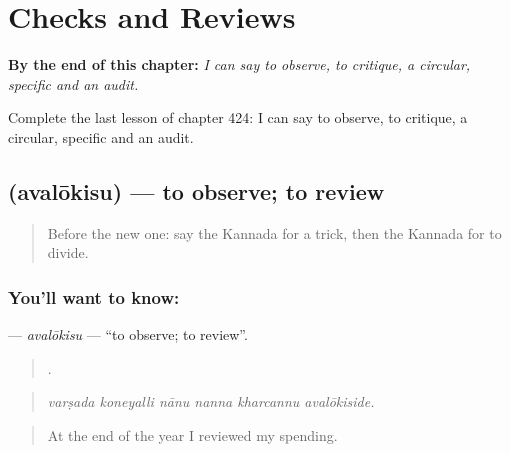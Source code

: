 
\chapter{Checks and Reviews}
\label{ch:ka-checks-and-reviews}

\begin{chapteropening}
\textbf{By the end of this chapter:} \emph{I can say to observe, to critique, a circular, specific and an audit.}

Complete the last lesson of chapter 424: I can say to observe, to critique, a circular, specific and an audit.
\end{chapteropening}

\section[\texorpdfstring{\kn{ಅವಲೋಕಿಸು} (avalōkisu)}{ಅವಲೋಕಿಸು (avalōkisu)}]{ (avalōkisu) — to observe; to review}

\label{lesson:KA-C424-avalokisu}



\begin{quote}
Before the new one: say the Kannada for a trick, then the Kannada for to divide.
\end{quote}

\subsection*{You'll want to know: }
\textbf{} — \emph{avalōkisu} — \textquotedblleft{}to observe; to review\textquotedblright{}.

\begin{quote}
     .
\end{quote}

\begin{quote}
\emph{varṣada koneyalli nānu nanna kharcannu avalōkiside.}
\end{quote}

\begin{quote}
At the end of the year I reviewed my spending.
\end{quote}

